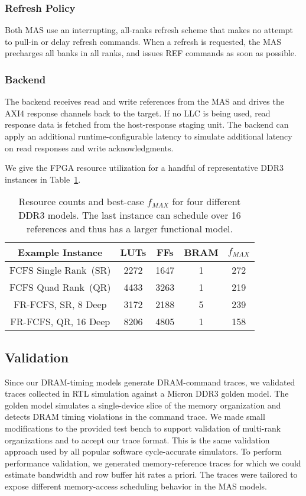 \subsubsection{Refresh Policy}
Both MAS use an interrupting, all-ranks refresh scheme that makes no attempt to
pull-in or delay refresh commands.  When a refresh is requested, the MAS
precharges all banks in all ranks, and issues REF commands as soon as possible.

\subsubsection{Backend}
The backend receives read and write references from the MAS and drives the AXI4
response channels back to the target. If no LLC is being used, read response data is fetched from the host-response staging unit.
The backend can apply an additional runtime-configurable latency to simulate
additional latency on read responses and write acknowledgments.

We give the FPGA resource utilization for a handful of representative DDR3
instances in Table~\ref{tbl:dram-model-resources}.

\begin{table}[htb]
\centering
    \begin{tabular}{c c c c c}
	\hline
        \textbf{Example Instance} & LUTs & FFs & BRAM & $f_{MAX}$ \\
	\hline
        FCFS Single Rank~(SR)    & 2272 & 1647 & 1 & 272 \\
        FCFS Quad Rank~(QR)    & 4433 & 3263 & 1 & 219 \\
        FR-FCFS, SR, 8 Deep & 3172 & 2188 & 5 & 239 \\
        FR-FCFS, QR, 16 Deep & 8206 & 4805 & 1 & 158 \\
	\hline
	\end{tabular}
    \caption{Resource counts and best-case $f_{MAX}$ for four different DDR3
    models. The last instance can schedule over 16 references and thus has a larger functional model.}
\label{tbl:dram-model-resources}
\vspace{-0.35in}
\end{table}

\subsection{Validation}
Since our DRAM-timing models generate DRAM-command traces, we validated
traces collected in RTL simulation against a Micron DDR3 golden model. The golden
model simulates a single-device slice of the memory organization and detects
DRAM timing violations in the command trace.  We made small modifications to
the provided test bench to support validation of multi-rank organizations and
to accept our trace format. This is the same validation approach used by all
popular software cycle-accurate simulators.
To perform performance validation, we generated memory-reference traces for
which we could estimate bandwidth and row buffer hit rates a priori. The traces
were tailored to expose different memory-access scheduling behavior in the MAS
models.

